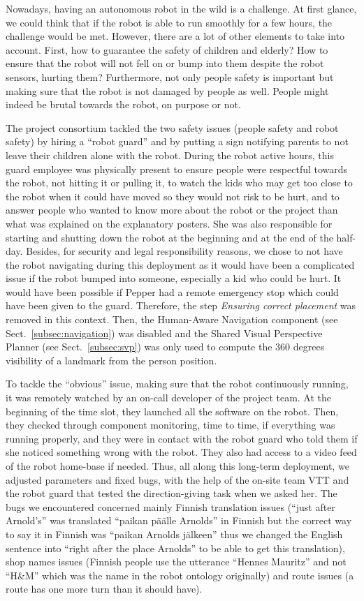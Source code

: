 \documentclass[a4paper,11pt,twoside]{StyleThese}
\begin{document}
Nowadays, having an autonomous robot in the wild is a challenge. At first glance, we could think that if the robot is able to run smoothly for a few hours, the challenge would be met. However, there are a lot of other elements to take into account. First, how to guarantee the safety of children and elderly? How to ensure that the robot will not fell on or bump into them despite the robot sensors, hurting them? Furthermore, not only people safety is important but making sure that the robot is not damaged by people as well. People might indeed be brutal towards the robot, on purpose or not. 

The project consortium tackled the two safety issues (people safety and robot safety) by hiring a ``robot guard'' and by putting a sign notifying parents to not leave their children alone with the robot. During the robot active hours, this guard employee was physically present to ensure people were respectful towards the robot, \ie not hitting it or pulling it, to watch the kids who may get too close to the robot when it could have moved so they would not risk to be hurt, and to answer people who wanted to know more about the robot or the project than what was explained on the explanatory posters. She was also responsible for starting and shutting down the robot at the beginning and at the end of the half-day. Besides, for security and legal responsibility reasons, we chose to not have the robot navigating during this deployment as it would have been a complicated issue if the robot bumped into someone, especially a kid who could be hurt. It would have been possible if Pepper had a remote emergency stop which could have been given to the guard. Therefore, the step \emph{Ensuring correct placement} was removed in this context. Then, the Human-Aware Navigation component (see Sect.~\ref{subsec:navigation}) was disabled and the Shared Visual Perspective Planner (see Sect.~\ref{subsec:svp}) was only used to compute the 360 degrees visibility of a landmark from the person position.

To tackle the ``obvious'' issue, making sure that the robot continuously running, it was remotely watched by an on-call developer of the project team. At the beginning of the time slot, they launched all the software on the robot. Then, they checked through component monitoring, time to time, if everything was running properly, and they were in contact with the robot guard who told them if she noticed something wrong with the robot. They also had access to a video feed of the robot home-base if needed. Thus, all along this long-term deployment, we adjusted parameters and fixed bugs, with the help of the on-site team VTT and the robot guard that tested the direction-giving task when we asked her. The bugs we encountered concerned mainly Finnish translation issues (\eg ``just after Arnold's'' was translated ``paikan päälle Arnolds'' in Finnish but the correct way to say it in Finnish was ``paikan Arnolds jälkeen'' thus we changed the English sentence into ``right after the place Arnolds'' to be able to get this translation), shop names issues (\eg Finnish people use the utterance ``Hennes Mauritz'' and not ``H\&M'' which was the name in the robot ontology originally) and route issues (\eg a route has one more turn than it should have).
\end{document}
